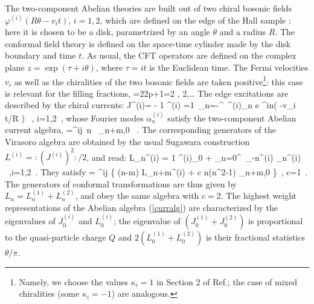 The two-component Abelian theories are built out of two
chiral bosonic fields $\varphi^{(i)}(R\theta -v_i t)$,
$i=1,2$, which are defined on the edge of the Hall sample \cite{wen}:
here it is chosen to be a disk, parametrized by an angle
$\theta$ and a radius $R$. The conformal field theory is
defined on the space-time cylinder made by the disk 
boundary and time $t$. As usual, the CFT operators are
defined on the complex plane $z=\exp(\tau + i\theta)$, 
where $\tau=it$ is the Euclidean time.
The Fermi velocities $v_i$ as well as the chiralities of the
two bosonic fields are taken positive\footnote{
Namely, we choose the values $\kappa_i=1$ in Section $2$ of 
Ref.\cite{ctz5};
the case of mixed chiralities (some $\kappa_i=-1$) are analogous.}:
this case is relevant for the filling fractions,
\beq
\nu={2\over 2p+1}={2 }, {2},\dots 
\label{twojain}\eeq
The edge excitations are described by the chiral currents:
\beq
J^{(i)}= - {1\pi} {\partial \varphi^{(i)}\over \partial\theta}
={1\pi}\  \sum_{n=-\infty}^\infty \ 
\a^{(i)}_n {\rm e }^{in\left( \theta -v_i t/R \right)} \ ,\qquad
i=1,2\ ,
\eeq
whose Fourier modes $\alpha_n^{(i)}$ satisfy the
two-component Abelian current algebra,
\beq
\left[\ \a^{(i)}_n \ ,\ \a^{(j)}_m\ \right] =\delta^{ij}\ n \ 
\delta_{n+m,0} \ .
\label{curralg}
\eeq
The corresponding generators of the Virasoro algebra are obtained by
the usual Sugawara construction 
$L^{(i)} = : \left( J^{(i)} \right)^2 :/2$, and read:
\beq
L_n^{(i)} = {1} \a^{(i)}_0 + \sum_{n=0}^\infty\ 
\a_{-n}^{(i)} \a_n^{(i)} \ ,\qquad\qquad\qquad i=1,2\ .
\label{ln}\eeq
They satisfy
\beq
\left[\ L_n^{(i)} \ ,\ L_m^{(j)} \ \right] = \delta^{ij}
\left\{ (n-m) L_{n+m}^{(i)} + {c}
n(n^2-1) \delta_{n+m,0} \right\}\ , \qquad c=1\ .
\label{viralg}
\eeq
The generators of conformal transformations are thus given by
$L_n=L^{(1)}_n+L^{(2)}_n$, and obey the same algebra with
$c=2$. The highest weight representations of the Abelian
algebra (\ref{curralg}) are characterized by the
eigenvalues of $J^{(i)}_0$ and $L^{(i)}_0$;
the eigenvalue of $\left(J^{(1)}_0+J^{(2)}_0 \right)$ is
proportional to the quasi-particle charge $Q$ and
$2\left( L^{(1)}_0+L^{(2)}_0 \right)$ is their
fractional statistics $\theta/\pi$.

